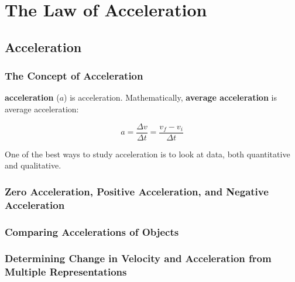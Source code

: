 \documentclass[dvipsnames]{article}
\newif\ifShowUnitIII                             %
\begin{document}




\fi

\clearpage

\section{The Law of Acceleration}

\ifShowUnitIII
\setcounter{example}{0}

\subsection{Acceleration}

\subsubsection{The Concept of Acceleration}

\textbf{\Gls{acceleration}} ($a$) is \glsdesc{acceleration}. Mathematically, \textbf{\gls{average acceleration}} is \gls{average acceleration}:

\begin{equation*}
    a = \frac{\Delta v}{\Delta t} = \frac{v_f - v_i}{\Delta t}
\end{equation*}

One of the best ways to study acceleration is to look at data, both quantitative and qualitative. 

\subsubsection{Zero Acceleration, Positive Acceleration, and Negative Acceleration}

\subsubsection{Comparing Accelerations of Objects}

\subsubsection{Determining Change in Velocity and Acceleration from Multiple Representations}
\end{document}
